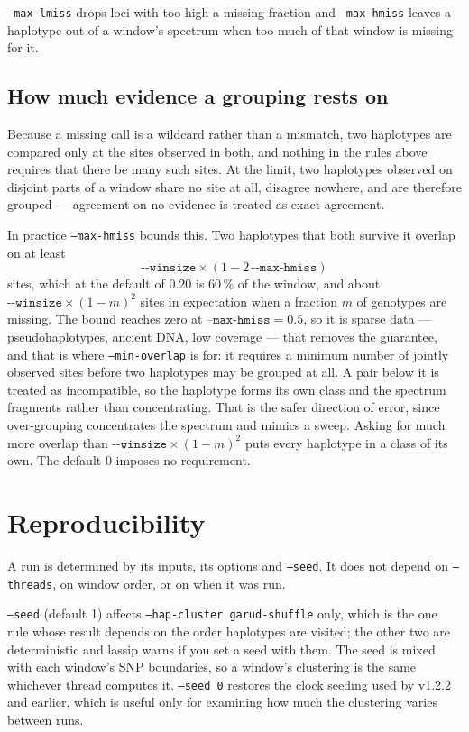\documentclass[11pt]{article}
\newcommand{\opt}[1]{\texttt{#1}}
\begin{document}
\opt{--max-lmiss} drops loci with too high a missing fraction and
\opt{--max-hmiss} leaves a haplotype out of a window's spectrum when too much
of that window is missing for it.

\subsection*{How much evidence a grouping rests on}

Because a missing call is a wildcard rather than a mismatch, two haplotypes are
compared only at the sites observed in both, and nothing in the rules above
requires that there be many such sites. At the limit, two haplotypes observed
on disjoint parts of a window share no site at all, disagree nowhere, and are
therefore grouped --- agreement on no evidence is treated as exact agreement.

In practice \opt{--max-hmiss} bounds this. Two haplotypes that both survive it
overlap on at least
%
\begin{equation*}
\texttt{-{}-winsize} \times (1 - 2\,\texttt{-{}-max-hmiss})
\end{equation*}
%
sites, which at the default of $0.20$ is $60\,\%$ of the window, and about
$\texttt{-{}-winsize} \times (1-m)^2$ sites in expectation when a fraction $m$
of genotypes are missing. The bound reaches zero at
$\opt{--max-hmiss} = 0.5$, so it is sparse data --- pseudohaplotypes, ancient
DNA, low coverage --- that removes the guarantee, and that is where
\opt{--min-overlap} is for: it requires a minimum number of jointly observed
sites before two haplotypes may be grouped at all. A pair below it is treated
as incompatible, so the haplotype forms its own class and the spectrum
fragments rather than concentrating. That is the safer direction of error,
since over-grouping concentrates the spectrum and mimics a sweep. Asking for
much more overlap than $\texttt{-{}-winsize} \times (1-m)^2$ puts every
haplotype in a class of its own. The default 0 imposes no requirement.

\section{Reproducibility}

A run is determined by its inputs, its options and \opt{--seed}. It does not
depend on \opt{--threads}, on window order, or on when it was run.

\opt{--seed} (default 1) affects \opt{--hap-cluster garud-shuffle} only, which
is the one rule whose result depends on the order haplotypes are visited; the
other two are deterministic and lassip warns if you set a seed with them. The
seed is mixed with each window's SNP boundaries, so a window's clustering is the
same whichever thread computes it. \opt{--seed 0} restores the clock seeding
used by v1.2.2 and earlier, which is useful only for examining how much the
clustering varies between runs.
\end{document}
